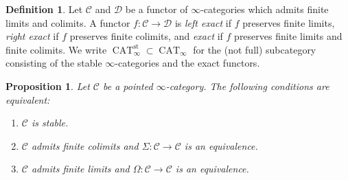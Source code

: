 \documentclass{article}
\newtheorem{proposition}{Proposition}[subsection]
\theoremstyle{definition}
\newtheorem{definition}{Definition}[subsection]
\newcommand{\C}{\mathcal{C}}
\newcommand{\D}{\mathcal{D}}
\renewcommand{\i}{\infty}
\DeclareMathOperator{\CAT}{CAT}
\newcommand{\st}{\mathrm{st}}
\begin{document}
\begin{definition}
Let $\C$ and $\D$ be a functor of $\i$-categories which admits finite limits and colimits.
A functor $f:\C\to\D$ is {\em left exact} if $f$ preserves finite limits, {\em right exact} if $f$ preserves finite colimits, and {\em exact} if $f$ preserves finite limits and finite colimits.
We write $\CAT_\i^{\st}\subset\CAT_\i$ for the (not full) subcategory consisting of the stable $\i$-categories and the exact functors.
\end{definition}
\begin{proposition}{\em \cite[Corollary 1.4.2.11]{HA}}
Let $\C$ be a pointed $\i$-category.
The following conditions are equivalent:
\begin{enumerate}\itemsep.1em
\item[\emph{(1)}]
$\C$ is stable.
\item[\emph{(2)}]
$\C$ admits finite colimits and $\Sigma:\C\to\C$ is an equivalence.
\item[\emph{(3)}]
$\C$ admits finite limits and $\Omega:\C\to\C$ is an equivalence.
\end{enumerate}
\end{proposition}
\end{document}
